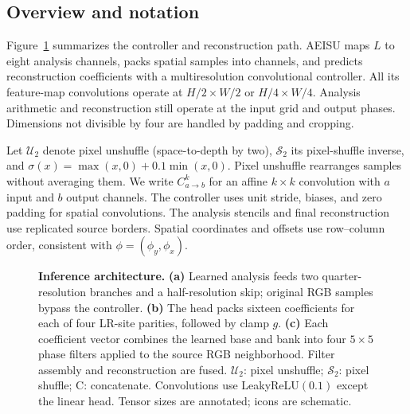 \documentclass[10pt,twocolumn,letterpaper]{article}
\newcommand{\model}{AEISU}
\newcommand{\U}{\mathcal{U}}
\newcommand{\PS}{\mathcal{S}}
\begin{document}
\subsection{Overview and notation}
Figure~\ref{fig:architecture} summarizes the controller and reconstruction path.
\model{} maps $L$ to eight analysis channels, packs spatial samples into channels, and predicts reconstruction coefficients with a multiresolution convolutional controller.
All its feature-map convolutions operate at $H/2\times W/2$ or $H/4\times W/4$.
Analysis arithmetic and reconstruction still operate at the input grid and output phases.
Dimensions not divisible by four are handled by padding and cropping.

Let $\U_2$ denote pixel unshuffle (space-to-depth by two), $\PS_2$ its pixel-shuffle inverse, and $\sigma(x)=\max(x,0)+0.1\min(x,0)$.
Pixel unshuffle rearranges samples without averaging them.
We write $C^{k}_{a\rightarrow b}$ for an affine $k\times k$ convolution with $a$ input and $b$ output channels.
The controller uses unit stride, biases, and zero padding for spatial convolutions.
The analysis stencils and final reconstruction use replicated source borders.
Spatial coordinates and offsets use row--column order, consistent with $\phi=(\phi_y,\phi_x)$.

\begin{figure}[t]
\centering

\caption{\textbf{Inference architecture.} \textbf{(a)} Learned analysis feeds two quarter-resolution branches and a half-resolution skip; original RGB samples bypass the controller. \textbf{(b)} The head packs sixteen coefficients for each of four LR-site parities, followed by clamp $g$. \textbf{(c)} Each coefficient vector combines the learned base and bank into four $5\times5$ phase filters applied to the source RGB neighborhood. Filter assembly and reconstruction are fused. $\U_2$: pixel unshuffle; $\PS_2$: pixel shuffle; C: concatenate. Convolutions use LeakyReLU$(0.1)$ except the linear head. Tensor sizes are annotated; icons are schematic.}
\label{fig:architecture}
\end{figure}
\end{document}
